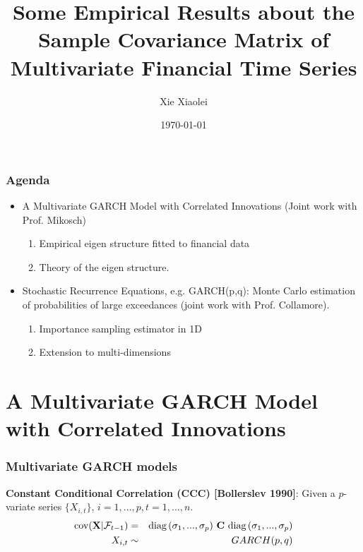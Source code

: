 \documentclass{beamer}
\title{Some Empirical Results about the Sample Covariance Matrix of
  Multivariate Financial Time Series}
\author{Xie Xiaolei} %
\institute[UCPH] %
{
University of Copenhagen \\ %
\medskip
\textit{xie@math.ku.dk} %
}
\date{\today} %
\begin{document}
\begin{frame}
\titlepage %
\end{frame}


\begin{frame}
  \frametitle{Agenda}
  \begin{itemize}
  \item A Multivariate GARCH Model with Correlated Innovations (Joint
    work with Prof. Mikosch)
    \begin{enumerate}
    \item Empirical eigen structure fitted to financial data
    \item Theory of the eigen structure.
    \end{enumerate}
  \item Stochastic Recurrence Equations, e.g. GARCH(p,q): Monte Carlo
    estimation of probabilities of large exceedances (joint work with
    Prof. Collamore).
    \begin{enumerate}
    \item Importance sampling estimator in 1D
    \item Extension to multi-dimensions
    \end{enumerate}
  \end{itemize}
\end{frame}

\section{A Multivariate GARCH Model with Correlated Innovations}
\begin{frame}
  \frametitle{Multivariate GARCH models}
  {\bf Constant Conditional Correlation (CCC) [Bollerslev 1990]}:
  Given a $p$-variate series $\{X_{i, t}\}$, $i=1,...,p,
  t=1,...,n$.
  \begin{eqnarray*}
    \cov(\vec X | \mathcal F_{t-1}) &=&
    \diag(\sigma_1, ..., \sigma_p) \ 
    \mtx C \ 
    \diag(\sigma_1, ..., \sigma_p) \\
    X_{i, t} &\sim& GARCH(p,q)
  \end{eqnarray*}
\end{frame}
\end{document}
